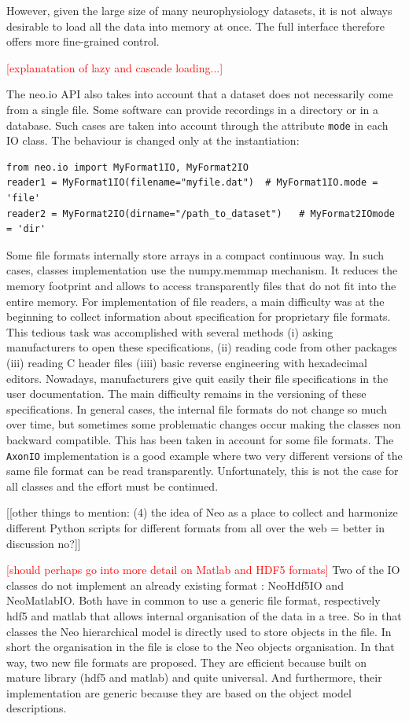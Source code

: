 \documentclass{frontiers}
\newcommand{\missing}[1]{\textcolor{red}{#1}}
\newcommand{\samuel}[1]{[\textcolor{RubineRed}{#1}]}
\begin{document}
However, given the large size of many neurophysiology datasets, it is not always desirable to load all the data into memory at once. The full interface therefore offers more fine-grained control.

\missing{[explanatation of lazy and cascade loading...]}


The neo.io API also takes into account that a dataset does not necessarily come from a single file. Some software can provide recordings in a directory or in a database. Such cases are taken into account through the attribute \lstinline`mode` in each IO class. The behaviour is changed only at the instantiation:

\begin{lstlisting}[style=display]
from neo.io import MyFormat1IO, MyFormat2IO
reader1 = MyFormat1IO(filename="myfile.dat")  # MyFormat1IO.mode = 'file'
reader2 = MyFormat2IO(dirname="/path_to_dataset")   # MyFormat2IOmode = 'dir'
\end{lstlisting}

Some file formats internally store arrays in a compact continuous way. In such cases, classes implementation use the numpy.memmap mechanism. It reduces the memory footprint and allows to access transparently files that do not fit into the entire memory.
For implementation of file readers, a main difficulty was at the beginning to collect information about specification for proprietary file formats. This tedious task was accomplished with several methods (i) asking manufacturers to open these specifications, (ii) reading code from other packages (iii) reading C header files (iiii) basic reverse engineering with hexadecimal editors. Nowadays, manufacturers give quit easily their file specifications in the user documentation.
The main difficulty remains in the versioning of these specifications. In general cases, the internal file formats do not change so much over time, but sometimes some problematic changes occur making the classes non backward compatible. This has been taken in account for some file formats. The \lstinline`AxonIO` implementation is a good example where two very different versions of the same file format can be read transparently. Unfortunately, this is not the case for all classes and the effort must be continued.

\samuel{[other things to mention: (4) the idea of Neo as a place to collect and harmonize different Python scripts for different formats from all over the web = better in discussion no?]}


\missing{[should perhaps go into more detail on Matlab and HDF5 formats]}
Two of the IO classes do not implement an already existing format : NeoHdf5IO and NeoMatlabIO. Both have in common to use a generic file format, respectively hdf5 and matlab that allows internal organisation of the data in a tree. So in that classes the Neo hierarchical model is directly used to store objects in the file. In short the organisation in the file is close to the Neo objects organisation. In that way, two new file formats are proposed. They are efficient because built on mature library (hdf5 and matlab) and quite universal. And furthermore, their implementation are generic because they are based on the object model descriptions.
\end{document}
